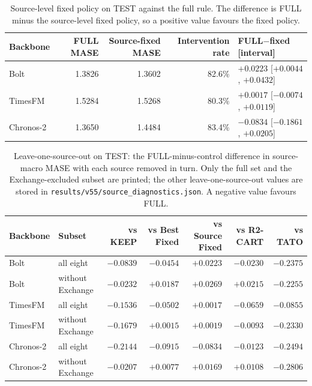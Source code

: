 \documentclass{article}
\begin{document}
\begin{table}[htbp]
\centering\small
\caption{Source-level fixed policy on TEST against the full rule. The difference is FULL
minus the source-level fixed policy, so a positive value favours the fixed policy.}
\label{tab:v53-source-fixed}
\begin{tabular*}{\textwidth}{@{\extracolsep{\fill}}lrrrl@{}}
\toprule
Backbone & FULL MASE & Source-fixed MASE & Intervention rate & FULL$-$fixed [interval] \\
\midrule
Bolt & 1.3826 & 1.3602 & 82.6\% & $+0.0223$ [$+0.0044$, $+0.0432$] \\
TimesFM & 1.5284 & 1.5268 & 80.3\% & $+0.0017$ [$-0.0074$, $+0.0119$] \\
Chronos-2 & 1.3650 & 1.4484 & 83.4\% & $-0.0834$ [$-0.1861$, $+0.0205$] \\
\bottomrule
\end{tabular*}
\end{table}

\begin{table}[htbp]
\centering\small
\caption{Leave-one-source-out on TEST: the FULL-minus-control difference in source-macro
MASE with each source removed in turn. Only the full set and the Exchange-excluded subset
are printed; the other leave-one-source-out values are stored in
\texttt{results/v55/source\_diagnostics.json}. A negative value favours FULL.}
\label{tab:v53-loso}
\begin{tabular*}{\textwidth}{@{\extracolsep{\fill}}llrrrrr@{}}
\toprule
Backbone & Subset & vs KEEP & vs Best Fixed & vs Source Fixed & vs R2-CART & vs TATO \\
\midrule
Bolt & all eight & $-0.0839$ & $-0.0454$ & $+0.0223$ & $-0.0230$ & $-0.2375$ \\
Bolt & without Exchange & $-0.0232$ & $+0.0187$ & $+0.0269$ & $+0.0215$ & $-0.2255$ \\
TimesFM & all eight & $-0.1536$ & $-0.0502$ & $+0.0017$ & $-0.0659$ & $-0.0855$ \\
TimesFM & without Exchange & $-0.1679$ & $+0.0015$ & $+0.0019$ & $-0.0093$ & $-0.2330$ \\
Chronos-2 & all eight & $-0.2144$ & $-0.0915$ & $-0.0834$ & $-0.0123$ & $-0.2494$ \\
Chronos-2 & without Exchange & $-0.0207$ & $+0.0077$ & $+0.0169$ & $+0.0108$ & $-0.2806$ \\
\bottomrule
\end{tabular*}
\end{table}
\end{document}
